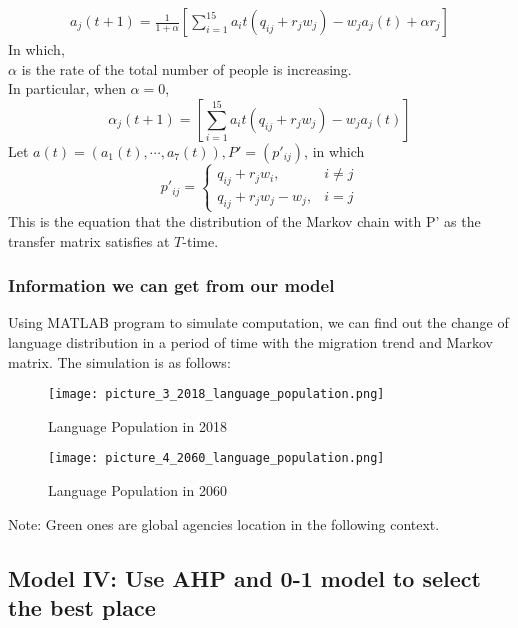 \documentclass{mcmthesis}
\begin{document}
\begin{eqnarray}
a_j(t+1) = \frac{1}{1+\alpha}[\sum_{i=1}^{15}{a_i{t}(q_{ij}+r_j w_j)}-w_j a_j(t)+\alpha r_j]
\end{eqnarray}
In which, \\
$\alpha$ is the rate of the total number of people is increasing. \\
In particular, when $\alpha = 0$,
\begin{equation}
\alpha_j(t+1)=[\sum_{i=1}^{15}{a_i{t}(q_{ij}+r_j w_j)}-w_j a_j(t)]
\end{equation}
Let $a(t)=(a_1(t),\cdots,a_7(t)), P'=(p'_{ij})$, in which
\begin{equation}
p'_{ij}=
\begin{cases} 
	q_{ij}+r_j w_i, &\text{$i\neq j$}\\
  	q_{ij}+r_j w_j - w_j, &\text{$i=j$}
\end{cases}
\end{equation}
This is the equation that the distribution of the Markov chain with P' as the transfer matrix satisfies at $T$-time.

\subsubsection{Information we can get from our model}
\hspace*{8mm}Using MATLAB program to simulate computation, we can find out the change of language distribution in a period of time with the migration trend and Markov matrix. The simulation is as follows: \\
\begin{figure}[h]
\centering
\texttt{[image: picture\_3\_2018\_language\_population.png]}
\caption{Language Population in 2018} \label{Language Population in 2018}
\end{figure}
\begin{figure}[h]
\centering
\texttt{[image: picture\_4\_2060\_language\_population.png]}
\caption{Language Population in 2060} \label{fig:Language Population in 2060}
\end{figure}
Note: Green ones are global agencies location in the following context.

\subsection{Model IV: Use AHP and 0-1 model to select the best place}
\end{document}
